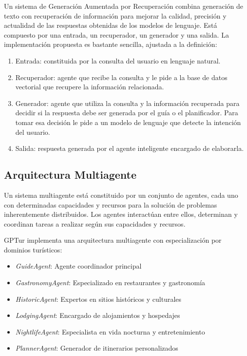 \documentclass[10pt]{llncs}
\begin{document}
Un sistema de Generación Aumentada por Recuperación combina generación de texto con recuperación de información para mejorar la calidad, precisión y actualidad de las respuestas obtenidas de los modelos de lenguaje. 
Está compuesto por una entrada, un recuperador, un generador y una salida. La implementación propuesta es bastante sencilla, ajustada a la definición:
\begin{enumerate}
    \item Entrada: constituida por la consulta del usuario en lenguaje natural.
    \item Recuperador: agente que recibe la consulta y le pide a la base de datos vectorial que recupere la información relacionada.
    \item Generador: agente que utiliza la consulta y la información recuperada para decidir si la respuesta debe ser generada por el guía o el planificador. Para tomar esa decisión le pide a un modelo de lenguaje que detecte la intención del usuario.
    \item Salida: respuesta generada por el agente inteligente encargado de elaborarla.
\end{enumerate}

\vspace{\baselineskip}
\subsection{Arquitectura Multiagente \cite{Garcia2020}}

Un sistema multiagente está constituido por un conjunto de agentes, cada uno con determinadas capacidades y recursos para la solución de problemas inherentemente distribuidos. Los agentes interactúan entre ellos, determinan y coordinan tareas a realizar según sus capacidades y recursos.

GPTur implementa una arquitectura multiagente con especialización por dominios turísticos:

\begin{itemize}
    \item \textit{GuideAgent}: Agente coordinador principal
    \item \textit{GastronomyAgent}: Especializado en restaurantes y gastronomía
    \item \textit{HistoricAgent}: Expertos en sitios históricos y culturales
    \item \textit{LodgingAgent}: Encargado de alojamientos y hospedajes
    \item \textit{NightlifeAgent}: Especialista en vida nocturna y entretenimiento
    \item \textit{PlannerAgent}: Generador de itinerarios personalizados
\end{itemize}
\end{document}
